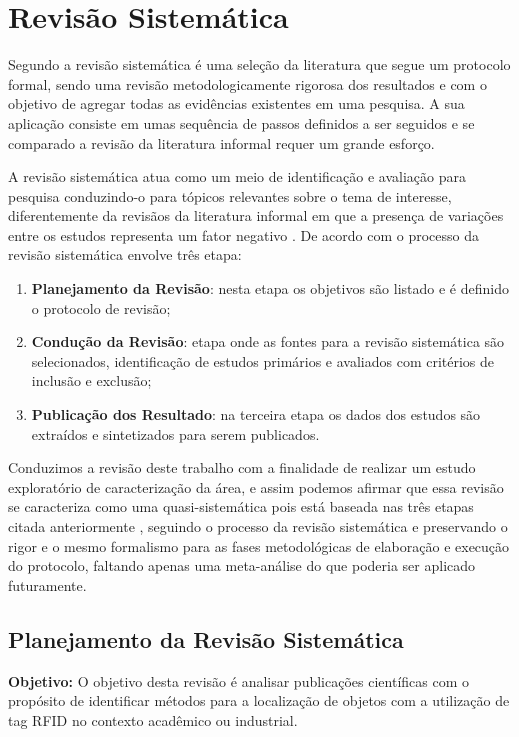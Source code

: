 \section{Revisão Sistemática}
			Segundo \citeauthor{Kitchenham:2009:SLR:1465742.1466091}  a revisão sistemática é uma seleção da literatura que segue um protocolo formal, sendo uma revisão metodologicamente rigorosa dos resultados e com o objetivo de agregar todas as evidências existentes em uma pesquisa. A sua aplicação consiste em umas sequência de passos definidos a ser seguidos e se comparado a revisão da literatura informal requer um grande esforço.
			
			\par 
			A revisão sistemática atua como um meio de identificação  e avaliação para pesquisa conduzindo-o para tópicos relevantes sobre o tema de interesse, diferentemente da revisãos da literatura informal em que a presença de variações entre os estudos representa um fator negativo
			\cite{MafraTravassos}. 
			De acordo com \citeauthor{MafraTravassos} o processo da revisão sistemática envolve três etapa: 
			\begin{enumerate}
			    \item \textbf{Planejamento da Revisão}: nesta etapa os objetivos são listado e é definido o protocolo de revisão;
			    \item \textbf{Condução da Revisão}: etapa onde as fontes para a revisão sistemática são selecionados, identificação de estudos primários e avaliados com critérios de inclusão e exclusão;
			    \item \textbf{Publicação dos Resultado}: na terceira etapa os dados dos estudos são extraídos e sintetizados para serem publicados.
			\end{enumerate}
			
			\par 
			Conduzimos a revisão deste trabalho com a finalidade de realizar um estudo exploratório de caracterização da área, e assim podemos afirmar que essa revisão se caracteriza como uma quasi-sistemática pois está baseada nas três etapas citada anteriormente \cite{MafraTravassos}, seguindo o processo da revisão sistemática e preservando o rigor e o mesmo formalismo para as fases metodológicas de elaboração e execução do protocolo, faltando apenas uma meta-análise do que poderia ser aplicado futuramente.
			

		\subsection{ Planejamento da Revisão Sistemática}
			\par
\textbf{Objetivo: }O objetivo desta revisão é analisar publicações científicas com o propósito de  identificar métodos para a localização de objetos com a utilização de tag RFID no contexto acadêmico ou industrial.
			
